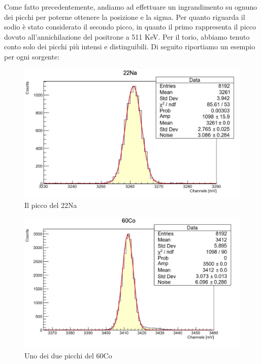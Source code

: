 \documentclass[a4paper,10pt]{article}
\begin{document}
Come fatto precedentemente, andiamo ad effettuare un ingrandimento su ognuno dei picchi per poterne ottenere la posizione e la sigma. Per quanto riguarda il sodio \`e stato considerato il secondo picco, in quanto il primo rappresenta il picco dovuto all'annichilazione del positrone a 511 KeV. Per il torio, abbiamo tenuto conto solo dei picchi pi\`u intensi e distinguibili. Di seguito riportiamo un esempio per ogni sorgente:

\begin{figure}[H]
    \centering
    \includegraphics[scale=0.45]{grafici/piccoNa}
    \caption{Il picco del 22Na}
\end{figure}

\begin{figure}[H]
    \centering
    \includegraphics[scale=0.45]{grafici/piccoCo}
    \caption{Uno dei due picchi del 60Co}
\end{figure}
\end{document}
